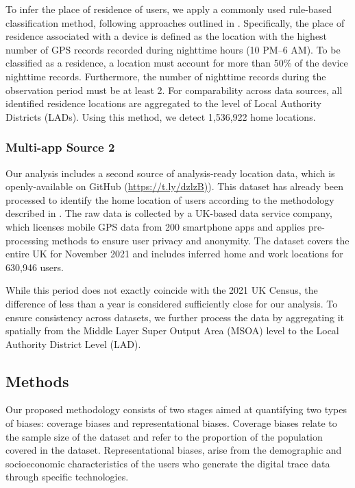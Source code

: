 \documentclass[]{rsos}%
\begin{document}
To infer the place of residence of users, we apply a commonly used rule-based classification method, following approaches outlined in \citep{wang2022, zhong24working}. Specifically, the place of residence associated with a device is defined as the location with the highest number of GPS records recorded during nighttime hours (10 PM--6 AM). To be classified as a residence, a location must account for more than 50\% of the device nighttime records. Furthermore, the number of nighttime records during the observation period must be at least 2. For comparability across data sources, all identified residence locations are aggregated to the level of Local Authority Districts (LADs). Using this method, we detect 1,536,922 home locations.

\hypertarget{multi-app-source-2}{%
\subsubsection{Multi-app Source 2}\label{multi-app-source-2}}

Our analysis includes a second source of analysis-ready location
data, which is openly-available on GitHub
(\href{https://t.ly/dzlzB}{https://t.ly/dzlzB)}). This dataset has already
been processed to identify the home location of users according to the
methodology described in \citep{zhong24working}. The raw data is collected by
a UK-based data service company, which licenses mobile GPS data from 200
smartphone apps and applies pre-processing methods to ensure user
privacy and anonymity. The dataset covers the entire UK for November 2021 and includes inferred home and work locations for 630,946 users.

While this period does not exactly coincide with the 2021 UK Census, the
difference of less than a year is considered sufficiently close for our
analysis. To ensure consistency across datasets, we further process the data by
aggregating it spatially from the Middle Layer Super Output Area (MSOA)
level to the Local Authority District Level (LAD).

\hypertarget{methods}{%
\subsection{Methods}\label{methods}}

Our proposed methodology consists of two stages aimed at quantifying two
types of biases: coverage biases and representational biases. Coverage
biases relate to the sample size of the dataset and refer to the
proportion of the population covered in the dataset. Representational
biases, arise from the demographic and socioeconomic characteristics of
the users who generate the digital trace data through specific
technologies.
\end{document}
